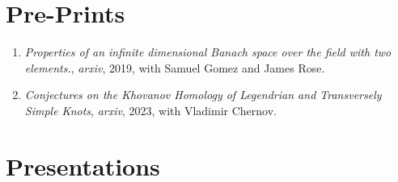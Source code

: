 \documentclass[a4paper,sans]{moderncv}
\begin{document}
    \section{Pre-Prints}
        \begin{enumerate}
            \item
                \textit{Properties of an infinite dimensional
                Banach space over the field with two elements.},
                \textit{arxiv}, 2019, with Samuel Gomez and James Rose.
            \item
                \textit{Conjectures on the Khovanov Homology of
                Legendrian and Transversely Simple Knots},
                \textit{arxiv}, 2023, with Vladimir Chernov.
        \end{enumerate}
    \section{Presentations}
\end{document}
